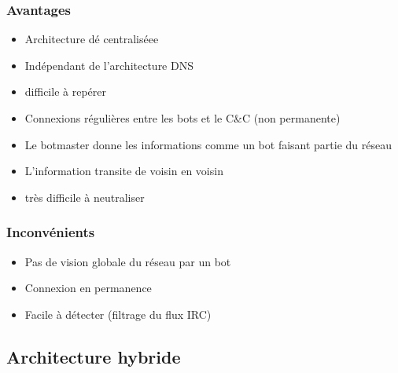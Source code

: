 \subsubsection{Avantages}
\begin{itemize}
	\item Architecture dé centraliséee
	\item Indépendant de l’architecture DNS
	\item difficile à repérer
	\item Connexions régulières entre les bots et le C\&C (non permanente)
	\item Le botmaster donne les informations comme un bot faisant partie du réseau
  \item L’information transite de voisin en voisin
	\item très difficile à neutraliser
\end{itemize}

\subsubsection{Inconvénients}
\begin{itemize}
	\item Pas de vision globale du réseau par un bot
	\item Connexion en permanence
	\item Facile à détecter (filtrage du flux IRC)
\end{itemize}



\subsection{Architecture hybride}

